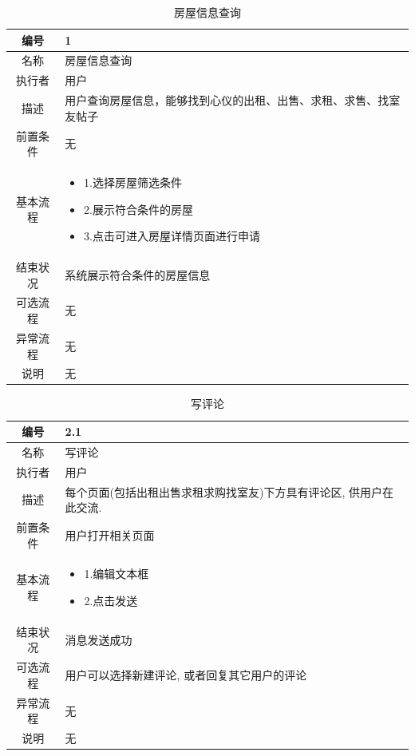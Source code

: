\begin{table}[htbp]
	\centering
	\begin{tabular}{|c|p{11cm}|}
        \hline
        编号 & 1 \\
        \hline
        名称 & 房屋信息查询 \\ 
        \hline
        执行者 &用户 \\
        \hline
        描述 & 用户查询房屋信息，能够找到心仪的出租、出售、求租、求售、找室友帖子        \\
        \hline
        前置条件 & 无 \\
        \hline
        基本流程 & \begin{itemize}
            \item 1.选择房屋筛选条件
            \item 2.展示符合条件的房屋
            \item  3.点击可进入房屋详情页面进行申请
        \end{itemize} \\
        \hline
        结束状况 &系统展示符合条件的房屋信息 \\
        \hline
        可选流程 & 无 \\
        \hline
        异常流程 & 无 \\
        \hline
        说明 & 无 \\
        \hline
    \end{tabular}
    \caption{房屋信息查询}
\end{table}

\begin{table}[htbp]
	\centering
	\begin{tabular}{|c|p{11cm}|}
        \hline
        编号 & 2.1 \\
        \hline
        名称 & 写评论 \\ 
        \hline
        执行者 &用户 \\
        \hline
        描述 & 每个页面(包括出租出售求租求购找室友)下方具有评论区, 供用户在此交流.        \\
        \hline
        前置条件 & 用户打开相关页面 \\
        \hline
        基本流程 & \begin{itemize}
            \item 1.编辑文本框
            \item 2.点击发送
        \end{itemize} \\
        \hline
        结束状况 & 消息发送成功 \\
        \hline
        可选流程 & 用户可以选择新建评论, 或者回复其它用户的评论 \\
        \hline
        异常流程 & 无 \\
        \hline
        说明 & 无 \\
        \hline
    \end{tabular}
    \caption{写评论}
\end{table}

